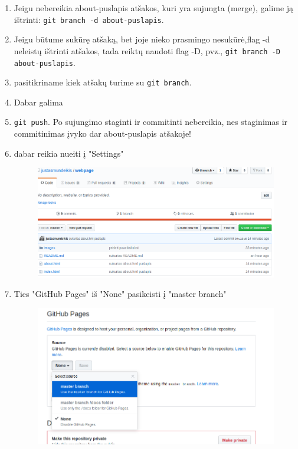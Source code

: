 \documentclass[12pt,a4paper]{article}
\begin{document}
\begin{enumerate}
\item Jeigu nebereikia about-puslapis atšakos, kuri yra sujungta (merge), galime ją ištrinti: \colorbox{listinggray}{\lstinline|git branch -d about-puslapis|}. 

\item Jeigu būtume sukūrę atšaką, bet joje nieko prasmingo nesukūrė,flag -d neleistų ištrinti atšakos, tada reiktų naudoti flag -D, pvz.,  \colorbox{listinggray}{\lstinline|git branch -D about-puslapis|}. 

\item pasitikriname kiek atšakų turime su  \colorbox{listinggray}{\lstinline|git branch|}.

\item Dabar galima \item \colorbox{listinggray}{\lstinline|git push|}. Po sujungimo staginti ir commitinti nebereikia, nes staginimas ir commitinimas įvyko dar about-puslapis atšakoje!

\item dabar reikia nueiti į "Settings" 
\begin{figure}[H]
\center
\includegraphics[scale=0.4]{webpage_10.png}
\end{figure}

\item Ties "GitHub Pages" iš "None" pasikeisti į "master branch"

\begin{figure}[H]
\center
\includegraphics[scale=0.4]{webpage_11.png}
\end{figure}


\end{enumerate}
\end{document}
